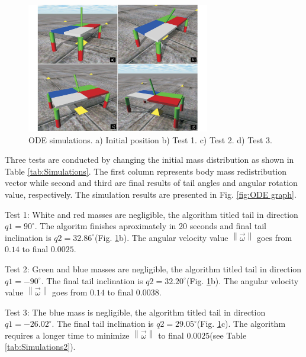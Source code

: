 \begin{figure}
	\centering
	\includegraphics[width=80mm]{./pictures/ODE_simulations.pdf}
	\caption{ODE simulations. a) Initial position b) Test 1. c) Test 2. d) Test 3.}
	\label{fig:ODESimulations}
\end{figure}

Three tests are conducted by changing the initial mass distribution as shown in Table \ref{tab:Simulations}. The first column represents body mass redistribution vector while second and third are final results of tail angles and angular rotation value, respectively. The simulation results are presented in Fig. \ref{fig:ODE graph}. 

Test 1: White and red masses are negligible, the algorithm titled tail in direction $q1=90^{\circ}$. The algoritm finishes aproximately in 20 seconds and final tail inclination is $q2=32.86^{\circ}$(Fig. \ref{fig:ODESimulations}b). The angular velocity value $\left \| \vec{\omega} \right \|$ goes from $0.14$ to final $0.0025$.

Test 2: Green and blue masses are negligible, the algorithm titled tail in direction $q1=-90^{\circ}$. The final tail inclination is $q2=32.20^{\circ}$(Fig. \ref{fig:ODESimulations}b). The angular velocity value $\left \| \vec{\omega} \right \|$ goes from $0.14$ to final $0.0038$. 

Test 3: The blue mass is negligible, the algorithm titled tail in direction $q1=-26.02^{\circ}$. The final tail inclination is $q2=29.05^{\circ}$(Fig. \ref{fig:ODESimulations}c). The algorithm requires a longer time to minimize $\left \| \vec{\omega} \right \|$ to final $0.0025$(see Table \ref{tab:Simulations2}).


